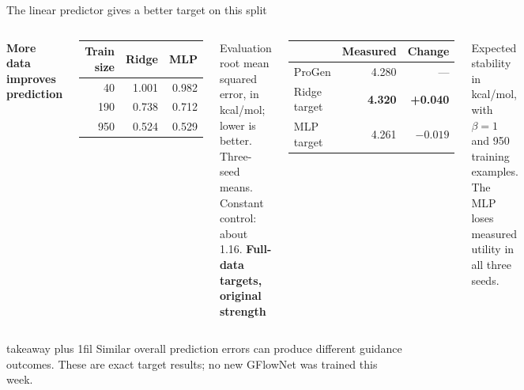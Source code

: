 \documentclass[10pt,aspectratio=169]{beamer}
\renewcommand{\arraystretch}{1.17}
\newcommand{\takeaway}[1]{%
  \par\vspace{2mm}\vfill
  \begin{beamercolorbox}[wd=\textwidth,sep=2mm]{takeaway}
    \small\RaggedRight\leftskip=2mm\rightskip=2mm plus 1fil #1
  \end{beamercolorbox}
}
\begin{document}
\begin{frame}[t]{The linear predictor gives a better target on this split}
\RaggedRight
\begin{columns}[T,onlytextwidth]
\RaggedRight
\textbf{More data improves prediction}
\begin{center}
\renewcommand{\arraystretch}{1.22}
\begin{tabular}{rrr}
\toprule
Train size & Ridge & MLP\\
\midrule
40 & 1.001 & 0.982\\
190 & 0.738 & 0.712\\
950 & 0.524 & 0.529\\
\bottomrule
\end{tabular}
\end{center}
Evaluation root mean squared error, in kcal/mol; lower is better.
Three-seed means. Constant control: about 1.16.
\RaggedRight
\textbf{Full-data targets, original strength}
\begin{center}
\renewcommand{\arraystretch}{1.22}
\begin{tabular}{lrr}
\toprule
 & Measured & Change\\
\midrule
ProGen & 4.280 & ---\\
Ridge target & \textbf{4.320} & \textbf{+0.040}\\
MLP target & 4.261 & $-0.019$\\
\bottomrule
\end{tabular}
\end{center}
Expected stability in kcal/mol, with $\beta=1$ and 950 training examples.
The MLP loses measured utility in all three seeds.
\end{columns}
\takeaway{Similar overall prediction errors can produce different guidance outcomes.
These are exact target results; no new GFlowNet was trained this week.}
\end{frame}
\end{document}
